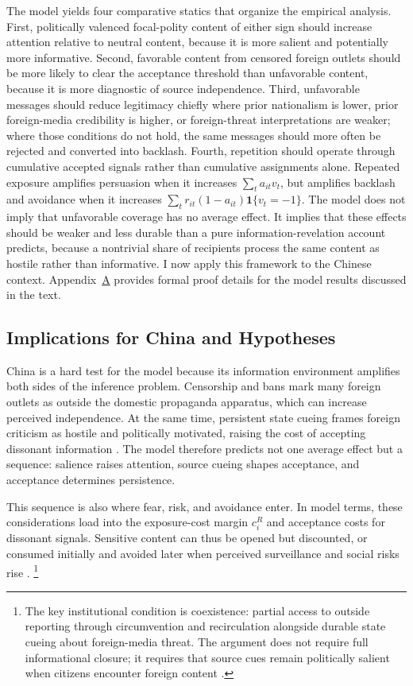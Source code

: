 \documentclass[12pt,american]{article}
\begin{document}
The model yields four comparative statics that organize the empirical analysis. First, politically valenced focal-polity content of either sign should increase attention relative to neutral content, because it is more salient and potentially more informative. Second, favorable content from censored foreign outlets should be more likely to clear the acceptance threshold than unfavorable content, because it is more diagnostic of source independence. Third, unfavorable messages should reduce legitimacy chiefly where prior nationalism is lower, prior foreign-media credibility is higher, or foreign-threat interpretations are weaker; where those conditions do not hold, the same messages should more often be rejected and converted into backlash. Fourth, repetition should operate through cumulative accepted signals rather than cumulative assignments alone. Repeated exposure amplifies persuasion when it increases \(\sum_t a_{it}v_t\), but amplifies backlash and avoidance when it increases \(\sum_t r_{it}(1-a_{it})\mathbf{1}\{v_t=-1\}\). The model does not imply that unfavorable coverage has no average effect. It implies that these effects should be weaker and less durable than a pure information-revelation account predicts, because a nontrivial share of recipients process the same content as hostile rather than informative. I now apply this framework to the Chinese context.
Appendix~\hyperref[app:formal_proofs]{A} provides formal proof details for the model results discussed in the text.

\subsection*{Implications for China and Hypotheses}

China is a hard test for the model because its information environment amplifies both sides of the inference problem. Censorship and bans mark many foreign outlets as outside the domestic propaganda apparatus, which can increase perceived independence. At the same time, persistent state cueing frames foreign criticism as hostile and politically motivated, raising the cost of accepting dissonant information \citep{stockmann2013,weiss2014powerful,GallagherMiller2021,Wu2026}. The model therefore predicts not one average effect but a sequence: salience raises attention, source cueing shapes acceptance, and acceptance determines persistence.

This sequence is also where fear, risk, and avoidance enter. In model terms, these considerations load into the exposure-cost margin \(c_i^R\) and acceptance costs for dissonant signals. Sensitive content can thus be opened but discounted, or consumed initially and avoided later when perceived surveillance and social risks rise \citep{QinStrombergWu2017,roberts2018,wangwestwood2024}. \footnote{The key institutional condition is coexistence: partial access to outside reporting through circumvention and recirculation alongside durable state cueing about foreign-media threat. The argument does not require full informational closure; it requires that source cues remain politically salient when citizens encounter foreign content \citep{ChangEtAl2022,hobbsroberts2018,kingpanroberts2013,roberts2018,stockmann2013}.}
\end{document}
